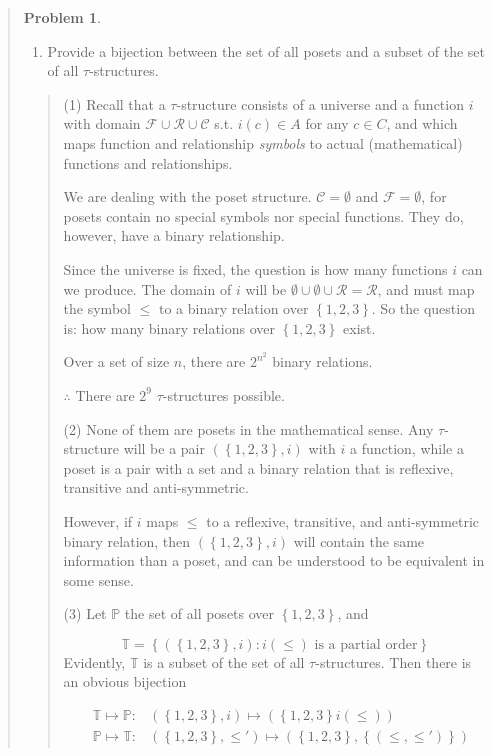\documentclass[a4paper, 12pt]{article}
\theoremstyle{definition}
\newtheorem{problem}{Problem}
\theoremstyle{definition}
\theoremstyle{definition}
\begin{document}
\begin{quote}
\begin{problem}
\begin{enumerate}
        \item Provide a bijection between the set of all posets and a subset 
            of  the set of all $\tau$-structures.
    \end{enumerate}
\end{problem}


\small
\begin{quote}

(1) Recall that a $\tau$-structure consists of a universe and a function $i$ with
domain $\mathcal{F} \cup \mathcal{R} \cup \mathcal{C}$ s.t. $i(c) \in A$ for
any $c \in C$, and which maps function and relationship \textit{symbols} to
actual (mathematical) functions and relationships.

We are dealing with the poset structure. $\mathcal{C} =\emptyset$ and
$\mathcal{F} = \emptyset$, for posets contain no special symbols nor special
functions. They do, however, have a binary relationship.

Since the universe is fixed, the question is how many functions $i$ can we
produce. The domain of $i$ will be $\emptyset \cup  \emptyset \cup \mathcal{R}
= \mathcal{R}$, and must map the symbol $\leq$ to a binary relation over
$\left\{ 1, 2, 3 \right\} $. So the question is: how many binary relations over
$\left\{ 1, 2, 3 \right\} $ exist. 

Over a set of size $n$, there are $2^{n^2}$ binary relations. 

$\therefore $ There are $2^{9}$ $\tau$-structures possible.

(2) None of them are posets in the mathematical sense. Any $\tau$-structure
will be a pair $(\left\{ 1, 2,3 \right\}, i) $ with $i$ a function, while 
a poset is a pair with a set and a binary relation that is reflexive,
transitive and anti-symmetric. 

However, if $i$ maps $\leq$ to a reflexive, transitive, and anti-symmetric 
binary relation, then $(\left\{ 1, 2, 3 \right\}, i) $ will contain 
the same information than a poset, and can be understood to be 
equivalent in some sense.

(3) Let $\mathbb{P}$ the set of all posets over $\left\{ 1, 2, 3 \right\} $,
and 

$$\mathbb{T} = \left\{ (\left\{ 1, 2, 3 \right\}, i ) : i(\leq) \text{ is a partial order} \right\} $$
Evidently, $\mathbb{T}$ is a subset of the set of all 
$\tau$-structures. Then there is an obvious bijection 

\begin{align*}
    &\mathbb{T} \mapsto  \mathbb{P} :
    &(\left\{ 1,2,3 \right\} , i) \mapsto (\left\{ 1, 2, 3 \right\} i(\leq))   \\ 
    &\mathbb{P} \mapsto \mathbb{T} : &\left( \left\{ 1, 2, 3 \right\}, \leq' \right) \mapsto \left( \left\{ 1, 2, 3 \right\}, \left\{ (\leq, \leq') \right\}   \right) 
\end{align*}





\end{quote}
\end{quote}
\end{document}
